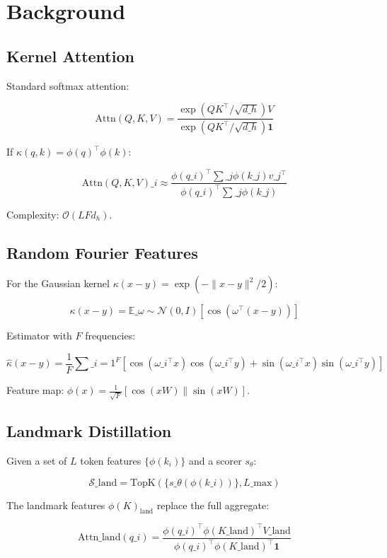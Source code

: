 \section{Background}

\subsection{Kernel Attention}

Standard softmax attention:

\[
\text{Attn}(Q, K, V) = \frac{\exp(QK^\top / \sqrt{d\_h}) V}{\exp(QK^\top / \sqrt{d\_h}) \mathbf{1}}
\tag{3.1}
\]

If $\kappa(q, k) = \phi(q)^\top \phi(k)$:

\[
\text{Attn}(Q, K, V)\_i \approx \frac{\phi(q\_i)^\top \sum\_j \phi(k\_j) v\_j^\top}{\phi(q\_i)^\top \sum\_j \phi(k\_j)}
\tag{3.2}
\]

Complexity: $\mathcal{O}(L F d_h)$.

\subsection{Random Fourier Features}

For the Gaussian kernel $\kappa(x - y) = \exp(-\|x - y\|^2 / 2)$:

\[
\kappa(x - y) = \mathbb{E}\_{\omega \sim \mathcal{N}(0, I)}[\cos(\omega^\top (x - y))]
\tag{3.3}
\]

Estimator with $F$ frequencies:

\[
\hat{\kappa}(x - y) = \frac{1}{F} \sum\_{i=1}^F [\cos(\omega\_i^\top x)\cos(\omega\_i^\top y) + \sin(\omega\_i^\top x)\sin(\omega\_i^\top y)]
\tag{3.4}
\]

Feature map: $\phi(x) = \frac{1}{\sqrt{F}} [\cos(xW) \| \sin(xW)]$.

\subsection{Landmark Distillation}

Given a set of $L$ token features $\{\phi(k_i)\}$ and a scorer $s_\theta$:

\[
\mathcal{S}\_\text{land} = \text{TopK}(\{s\_\theta(\phi(k\_i))\}, L\_\text{max})
\tag{3.5}
\]

The landmark features $\phi(K)_\text{land}$ replace the full aggregate:

\[
\text{Attn}\_\text{land}(q\_i) = \frac{\phi(q\_i)^\top \phi(K\_\text{land})^\top V\_\text{land}}{\phi(q\_i)^\top \phi(K\_\text{land})^\top \mathbf{1}}
\tag{3.6}
\]

